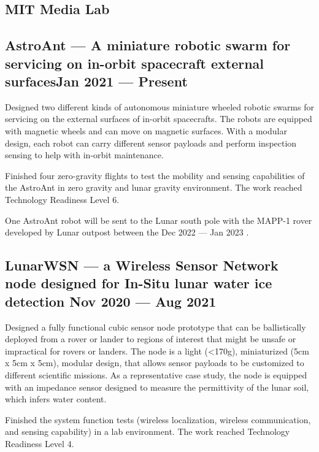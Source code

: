 \documentclass[letter,10pt]{article}
\begin{document}
\subsection{MIT Media Lab}
\subsection{{AstroAnt --- A miniature robotic swarm for servicing on in-orbit spacecraft external surfaces\hfill Jan 2021 --- Present}}
\begin{zitemize}
\item Designed two different kinds of autonomous miniature wheeled robotic swarms for servicing on the external surfaces of in-orbit spacecrafts. The robots are equipped with magnetic wheels and can move on magnetic surfaces. With a modular design, each robot can carry different sensor payloads and perform inspection sensing to help with in-orbit maintenance.
\item Finished four zero-gravity flights to test the mobility and sensing capabilities of the AstroAnt in zero gravity and lunar gravity environment. The work reached Technology Readiness Level 6.
\item One AstroAnt robot will be sent to the Lunar south pole with the MAPP-1 rover developed by Lunar outpost between the Dec 2022 --- Jan 2023 .
\end{zitemize}

\subsection{{LunarWSN --- a Wireless Sensor Network node designed for In-Situ lunar water ice detection \hfill Nov 2020 --- Aug 2021}}
\begin{zitemize}
\item Designed a fully functional cubic sensor node prototype that can be ballistically deployed from a rover or lander to regions of interest that might be unsafe or impractical for rovers or landers. The node is a light (<170g), miniaturized (5cm x 5cm x 5cm), modular design, that allows sensor payloads to be customized to different scientific missions. As a representative case study, the node is equipped with an impedance sensor designed to measure the permittivity of the lunar soil, which infers water content.
\item Finished the system function tests (wireless localization, wireless communication, and sensing capability) in a lab environment. The work reached Technology Readiness Level 4.
\end{zitemize}
\end{document}
